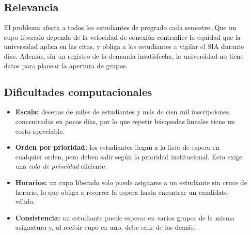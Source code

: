 \documentclass[conference]{IEEEtran}
\begin{document}
\subsection{Relevancia}
El problema afecta a todos los estudiantes de pregrado cada semestre. Que un cupo liberado dependa de la velocidad de conexión contradice la equidad que la universidad aplica en las citas, y obliga a los estudiantes a vigilar el SIA durante días. Además, sin un registro de la demanda insatisfecha, la universidad no tiene datos para planear la apertura de grupos.

\subsection{Dificultades computacionales}
\begin{itemize}
    \item \textbf{Escala:} decenas de miles de estudiantes y más de cien mil inscripciones concentradas en pocos días, por lo que repetir búsquedas lineales tiene un costo apreciable.
    \item \textbf{Orden por prioridad:} los estudiantes llegan a la lista de espera en cualquier orden, pero deben salir según la prioridad institucional. Esto exige una \emph{cola de prioridad} eficiente.
    \item \textbf{Horarios:} un cupo liberado solo puede asignarse a un estudiante sin cruce de horario, lo que obliga a recorrer la espera hasta encontrar un candidato válido.
    \item \textbf{Consistencia:} un estudiante puede esperar en varios grupos de la misma asignatura y, al recibir cupo en uno, debe salir de los demás.
\end{itemize}
\end{document}

